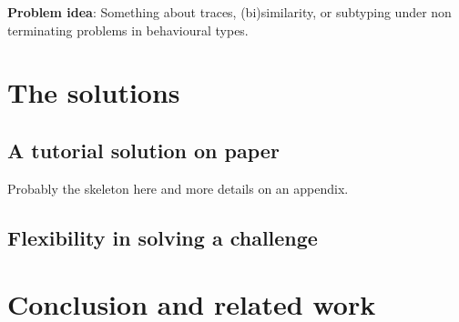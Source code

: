 \documentclass{article}
\begin{document}
\textbf{Problem idea}: Something about traces, (bi)similarity, or
subtyping under non terminating problems in behavioural types.

\section{The solutions}\label{sec:solutions}

\subsection{A tutorial solution on paper}\label{sec:tutorial}

Probably the skeleton here and more details on an appendix.

\subsection{Flexibility in solving a challenge}

\section{Conclusion and related work} \label{sec:conclusion}




\label{lastpage01}
\end{document}
